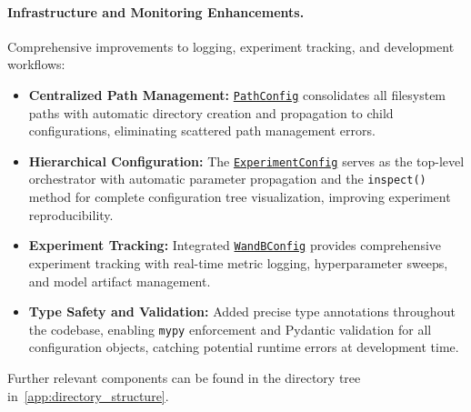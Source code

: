 \paragraph{Infrastructure and Monitoring Enhancements.}
Comprehensive improvements to logging, experiment tracking, and development workflows:

\begin{itemize}[leftmargin=*]
    \item \textbf{Centralized Path Management:} \href{https://github.com/JanDuchscherer104/UniTraj/blob/main/unitraj/configs/path_config.py}{\texttt{PathConfig}} consolidates all filesystem paths with automatic directory creation and propagation to child configurations, eliminating scattered path management errors.

    \item \textbf{Hierarchical Configuration:} The \href{https://github.com/JanDuchscherer104/UniTraj/blob/main/unitraj/configs/experiment_config.py}{\texttt{ExperimentConfig}} serves as the top-level orchestrator with automatic parameter propagation and the \texttt{inspect()} method for complete configuration tree visualization, improving experiment reproducibility.

    \item \textbf{Experiment Tracking:} Integrated \href{https://github.com/JanDuchscherer104/UniTraj/blob/main/unitraj/configs/wandb_config.py}{\texttt{WandBConfig}} provides comprehensive experiment tracking with real-time metric logging, hyperparameter sweeps, and model artifact management.

    \item \textbf{Type Safety and Validation:} Added precise type annotations throughout the codebase, enabling \texttt{mypy} enforcement and Pydantic validation for all configuration objects, catching potential runtime errors at development time.
\end{itemize}

Further relevant components can be found in the directory tree in~\autoref{app:directory_structure}.

\newpage